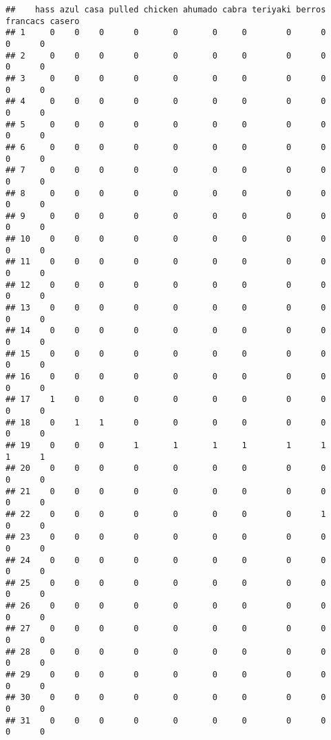 \documentclass[
]{article}
\begin{document}
\begin{verbatim}
##    hass azul casa pulled chicken ahumado cabra teriyaki berros francacs casero
## 1     0    0    0      0       0       0     0        0      0        0      0
## 2     0    0    0      0       0       0     0        0      0        0      0
## 3     0    0    0      0       0       0     0        0      0        0      0
## 4     0    0    0      0       0       0     0        0      0        0      0
## 5     0    0    0      0       0       0     0        0      0        0      0
## 6     0    0    0      0       0       0     0        0      0        0      0
## 7     0    0    0      0       0       0     0        0      0        0      0
## 8     0    0    0      0       0       0     0        0      0        0      0
## 9     0    0    0      0       0       0     0        0      0        0      0
## 10    0    0    0      0       0       0     0        0      0        0      0
## 11    0    0    0      0       0       0     0        0      0        0      0
## 12    0    0    0      0       0       0     0        0      0        0      0
## 13    0    0    0      0       0       0     0        0      0        0      0
## 14    0    0    0      0       0       0     0        0      0        0      0
## 15    0    0    0      0       0       0     0        0      0        0      0
## 16    0    0    0      0       0       0     0        0      0        0      0
## 17    1    0    0      0       0       0     0        0      0        0      0
## 18    0    1    1      0       0       0     0        0      0        0      0
## 19    0    0    0      1       1       1     1        1      1        1      1
## 20    0    0    0      0       0       0     0        0      0        0      0
## 21    0    0    0      0       0       0     0        0      0        0      0
## 22    0    0    0      0       0       0     0        0      1        0      0
## 23    0    0    0      0       0       0     0        0      0        0      0
## 24    0    0    0      0       0       0     0        0      0        0      0
## 25    0    0    0      0       0       0     0        0      0        0      0
## 26    0    0    0      0       0       0     0        0      0        0      0
## 27    0    0    0      0       0       0     0        0      0        0      0
## 28    0    0    0      0       0       0     0        0      0        0      0
## 29    0    0    0      0       0       0     0        0      0        0      0
## 30    0    0    0      0       0       0     0        0      0        0      0
## 31    0    0    0      0       0       0     0        0      0        0      0

\end{verbatim}
\end{document}
